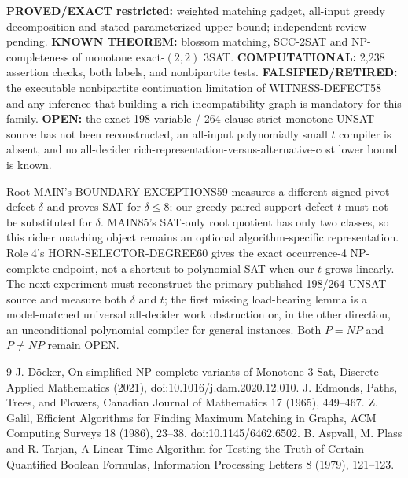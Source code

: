 \documentclass[11pt]{article}
\begin{document}
\textbf{PROVED/EXACT restricted:} weighted matching gadget, all-input greedy decomposition and stated parameterized upper bound; independent review pending. \textbf{KNOWN THEOREM:} blossom matching, SCC-2SAT and NP-completeness of monotone exact-$(2,2)$ 3SAT. \textbf{COMPUTATIONAL:} 2,238 assertion checks, both labels, and nonbipartite tests. \textbf{FALSIFIED/RETIRED:} the executable nonbipartite continuation limitation of WITNESS-DEFECT58 and any inference that building a rich incompatibility graph is mandatory for this family. \textbf{OPEN:} the exact 198-variable / 264-clause strict-monotone UNSAT source has not been reconstructed, an all-input polynomially small $t$ compiler is absent, and no all-decider rich-representation-versus-alternative-cost lower bound is known.

Root MAIN's BOUNDARY-EXCEPTIONS59 measures a different signed pivot-defect $\delta$ and proves SAT for $\delta\le8$; our greedy paired-support defect $t$ must not be substituted for $\delta$. MAIN85's SAT-only root quotient has only two classes, so this richer matching object remains an optional algorithm-specific representation. Role 4's HORN-SELECTOR-DEGREE60 gives the exact occurrence-4 NP-complete endpoint, not a shortcut to polynomial SAT when our $t$ grows linearly. The next experiment must reconstruct the primary published 198/264 UNSAT source and measure both $\delta$ and $t$; the first missing load-bearing lemma is a model-matched universal all-decider work obstruction or, in the other direction, an unconditional polynomial compiler for general instances. Both $P=NP$ and $P\ne NP$ remain OPEN.

\begin{thebibliography}{9}
 J. D\"ocker, On simplified NP-complete variants of Monotone 3-Sat, Discrete Applied Mathematics (2021), doi:10.1016/j.dam.2020.12.010.
 J. Edmonds, Paths, Trees, and Flowers, Canadian Journal of Mathematics 17 (1965), 449--467.
 Z. Galil, Efficient Algorithms for Finding Maximum Matching in Graphs, ACM Computing Surveys 18 (1986), 23--38, doi:10.1145/6462.6502.
 B. Aspvall, M. Plass and R. Tarjan, A Linear-Time Algorithm for Testing the Truth of Certain Quantified Boolean Formulas, Information Processing Letters 8 (1979), 121--123.
\end{thebibliography}
\end{document}
